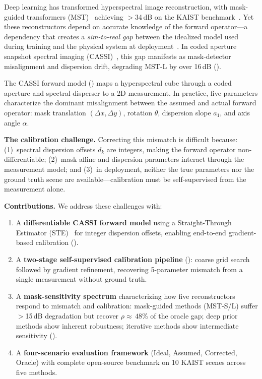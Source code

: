 \documentclass[runningheads]{llncs}
\begin{document}
Deep learning has transformed hyperspectral image reconstruction, with mask-guided transformers (MST)~\cite{cai2022mst,cai2022mst_pp} achieving $>$34\,dB on the KAIST benchmark~\cite{choi2017kaist}.
Yet these reconstructors depend on accurate knowledge of the forward operator---a dependency that creates a \emph{sim-to-real gap} between the idealized model used during training and the physical system at deployment~\cite{ongie2020deep}.
In coded aperture snapshot spectral imaging (CASSI)~\cite{wagadarikar2008cassi,arce2014cassi}, this gap manifests as mask-detector misalignment and dispersion drift, degrading MST-L by over 16\,dB ().

The CASSI forward model () maps a hyperspectral cube through a coded aperture and spectral disperser to a 2D measurement.
In practice, five parameters characterize the dominant misalignment between the assumed and actual forward operator: mask translation $(\Delta x, \Delta y)$, rotation $\theta$, dispersion slope $a_1$, and axis angle $\alpha$.

\textbf{The calibration challenge.}
Correcting this mismatch is difficult because: (1)~spectral dispersion offsets $d_k$ are integers, making the forward operator non-differentiable; (2)~mask affine and dispersion parameters interact through the measurement model; and (3)~in deployment, neither the true parameters nor the ground truth scene are available---calibration must be self-supervised from the measurement alone.

\textbf{Contributions.} We address these challenges with:
\begin{enumerate}
    \item A \textbf{differentiable CASSI forward model} using a Straight-Through Estimator (STE)~\cite{bengio2013ste} for integer dispersion offsets, enabling end-to-end gradient-based calibration ().
    \item A \textbf{two-stage self-supervised calibration pipeline} (): coarse grid search followed by gradient refinement, recovering 5-parameter mismatch from a single measurement without ground truth.
    \item A \textbf{mask-sensitivity spectrum} characterizing how five reconstructors respond to mismatch and calibration: mask-guided methods (MST-S/L) suffer ${>}$15\,dB degradation but recover $\rho {\approx}\,48$\% of the oracle gap; deep prior methods show inherent robustness; iterative methods show intermediate sensitivity ().
    \item A \textbf{four-scenario evaluation framework} (Ideal, Assumed, Corrected, Oracle) with complete open-source benchmark on 10 KAIST scenes across five methods.
\end{enumerate}
\end{document}
